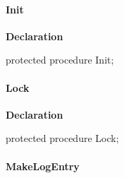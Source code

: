 \documentclass{report}
\newif\ifpdf
\begin{document}
\paragraph*{Init}\hspace*{\fill}

\label{AbArcTyp.TAbArchive-Init}
\begin{list}{}{
\setlength{\itemindent}{0cm}
\setlength{\listparindent}{0cm}
\setlength{\leftmargin}{\evensidemargin}
\addtolength{\leftmargin}{\tmplength}
\settowidth{\labelsep}{X}
\addtolength{\leftmargin}{\labelsep}
\setlength{\labelwidth}{\tmplength}
}
\item[\textbf{Declaration}\hfill]
\ifpdf
\begin{flushleft}
\fi
\begin{ttfamily}
protected procedure Init;\end{ttfamily}

\ifpdf
\end{flushleft}
\fi

\end{list}
\paragraph*{Lock}\hspace*{\fill}

\label{AbArcTyp.TAbArchive-Lock}
\begin{list}{}{
\setlength{\itemindent}{0cm}
\setlength{\listparindent}{0cm}
\setlength{\leftmargin}{\evensidemargin}
\addtolength{\leftmargin}{\tmplength}
\settowidth{\labelsep}{X}
\addtolength{\leftmargin}{\labelsep}
\setlength{\labelwidth}{\tmplength}
}
\item[\textbf{Declaration}\hfill]
\ifpdf
\begin{flushleft}
\fi
\begin{ttfamily}
protected procedure Lock;\end{ttfamily}

\ifpdf
\end{flushleft}
\fi

\end{list}
\paragraph*{MakeLogEntry}\hspace*{\fill}
\end{document}
